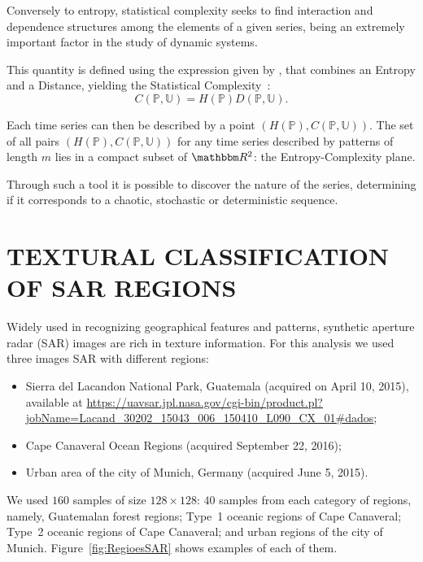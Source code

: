 \documentclass{isprs}
\begin{document}
	Conversely to entropy, statistical complexity seeks to find interaction and dependence structures among the elements of a given series, being an extremely important factor in the study of dynamic systems.
	
	This quantity is defined using the expression given by \citet{Lopez1995statistical}, 
	that combines an Entropy and a Distance, yielding the Statistical Complexity~\citep{Feldman2008information,Feldman1998Statistical}:
	\begin{equation}
	C(\mathbb{P}, \mathbb{U}) = H(\mathbb{P}) D(\mathbb{P}, \mathbb{U}).
	\end{equation}
	
	Each time series can then be described by a point $(H(\mathbb{P}), C(\mathbb{P}, \mathbb{U}))$.
	The set of all pairs $(H(\mathbb{P}), C(\mathbb{P}, \mathbb{U}))$ for any time series described by patterns of length $m$ lies in a compact subset of $\mathbbm R^2$: the Entropy-Complexity plane. 
	
	Through such a tool it is possible to discover the nature of the series, determining if it corresponds to a chaotic, stochastic or deterministic sequence.
	
	\section{TEXTURAL CLASSIFICATION OF SAR REGIONS}\label{SAR}
	
	Widely used in recognizing geographical features and patterns, synthetic aperture radar (SAR) images are rich in texture information. 
	For this analysis we used three images SAR with different regions:
	\begin{itemize}
		\item Sierra del Lacandon National Park, Guatemala (acquired on April 10, 2015), available at \url{https://uavsar.jpl.nasa.gov/cgi-bin/product.pl?jobName=Lacand_30202_15043_006_150410_L090_CX_01#dados};
		\item Cape Canaveral Ocean Regions (acquired September 22, 2016);
		\item Urban area of the city of Munich, Germany (acquired June 5, 2015).
	\end{itemize}
	
	We used $160$ samples of size $128\times128$: $40$ samples from each category of regions, namely,
	Guatemalan forest regions; 
	Type~1 oceanic regions of Cape Canaveral; 
	Type~2 oceanic regions of Cape Canaveral; and 
	urban regions of the city of Munich. 
	Figure~\ref{fig:RegioesSAR} shows examples of each of them.
	
\end{document}
